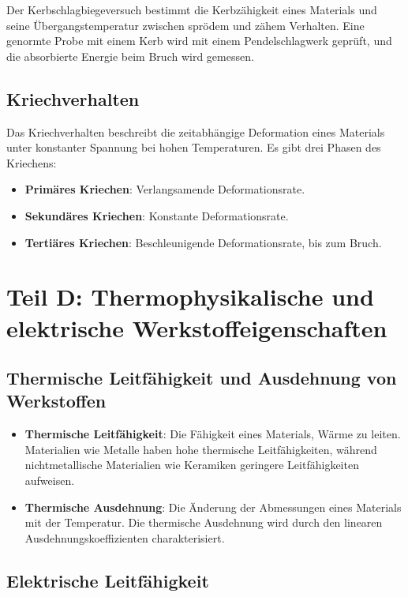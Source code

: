 \documentclass[a4paper,12pt]{article}
\begin{document}
Der Kerbschlagbiegeversuch bestimmt die Kerbzähigkeit eines Materials und seine Übergangstemperatur zwischen sprödem und zähem Verhalten. Eine genormte Probe mit einem Kerb wird mit einem Pendelschlagwerk geprüft, und die absorbierte Energie beim Bruch wird gemessen.

\subsection{Kriechverhalten}

Das Kriechverhalten beschreibt die zeitabhängige Deformation eines Materials unter konstanter Spannung bei hohen Temperaturen. Es gibt drei Phasen des Kriechens:
\begin{itemize}
    \item \textbf{Primäres Kriechen}: Verlangsamende Deformationsrate.
    \item \textbf{Sekundäres Kriechen}: Konstante Deformationsrate.
    \item \textbf{Tertiäres Kriechen}: Beschleunigende Deformationsrate, bis zum Bruch.
\end{itemize}

\newpage

\section{Teil D: Thermophysikalische und elektrische Werkstoffeigenschaften}

\subsection{Thermische Leitfähigkeit und Ausdehnung von Werkstoffen}

\begin{itemize}
    \item \textbf{Thermische Leitfähigkeit}: Die Fähigkeit eines Materials, Wärme zu leiten. Materialien wie Metalle haben hohe thermische Leitfähigkeiten, während nichtmetallische Materialien wie Keramiken geringere Leitfähigkeiten aufweisen.
    \item \textbf{Thermische Ausdehnung}: Die Änderung der Abmessungen eines Materials mit der Temperatur. Die thermische Ausdehnung wird durch den linearen Ausdehnungskoeffizienten charakterisiert.
\end{itemize}

\subsection{Elektrische Leitfähigkeit}
\end{document}
